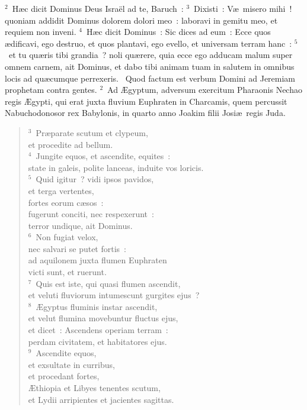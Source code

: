 ${}^{2}$~H\ae c dicit Dominus Deus Isra\"el ad te, Baruch~:
${}^{3}$~Dixisti~: V\ae\ misero mihi~! quoniam addidit Dominus dolorem dolori meo~: laboravi in gemitu meo, et requiem non inveni.
${}^{4}$~H\ae c dicit Dominus~: Sic dices ad eum~: Ecce quos \ae dificavi, ego destruo, et quos plantavi, ego evello, et universam terram hanc~:
${}^{5}$~et tu qu\ae ris tibi grandia~? noli qu\ae rere, quia ecce ego adducam malum super omnem carnem, ait Dominus, et dabo tibi animam tuam in salutem in omnibus locis ad qu\ae cumque perrexeris.
~Quod factum est verbum Domini ad Jeremiam prophetam contra gentes.
${}^{2}$~Ad \AE gyptum, adversum exercitum Pharaonis Nechao regis \AE gypti, qui erat juxta fluvium Euphraten in Charcamis, quem percussit Nabuchodonosor rex Babylonis, in quarto anno Joakim filii Josi\ae\ regis Juda.
\begin{flushleft}\begin{verse}${}^{3}$~Pr\ae parate scutum et clypeum,\\ et procedite ad bellum.\\
${}^{4}$~Jungite equos, et ascendite, equites~:\\ state in galeis, polite lanceas, induite vos loricis.\\
${}^{5}$~Quid igitur~? vidi ipsos pavidos,\\ et terga vertentes,\\ fortes eorum c\ae sos~:\\ fugerunt conciti, nec respexerunt~:\\ terror undique, ait Dominus.\\
${}^{6}$~Non fugiat velox,\\ nec salvari se putet fortis~:\\ ad aquilonem juxta flumen Euphraten\\ victi sunt, et ruerunt.\\
${}^{7}$~Quis est iste, qui quasi flumen ascendit,\\ et veluti fluviorum intumescunt gurgites ejus~?\\
${}^{8}$~\AE gyptus fluminis instar ascendit,\\ et velut flumina movebuntur fluctus ejus,\\ et dicet~: Ascendens operiam terram~:\\ perdam civitatem, et habitatores ejus.\\
${}^{9}$~Ascendite equos,\\ et exsultate in curribus,\\ et procedant fortes,\\ \AE thiopia et Libyes tenentes scutum,\\ et Lydii arripientes et jacientes sagittas.\\

\end{verse}
\end{flushleft}

